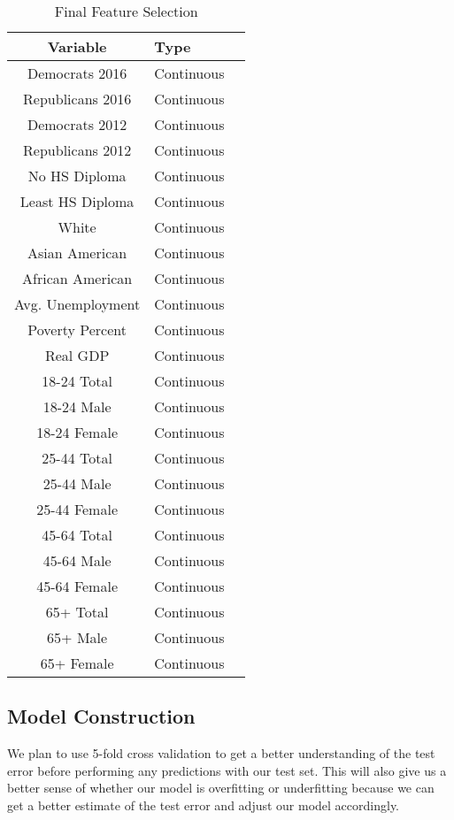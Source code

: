 \documentclass[letterpaper, twocolumn]{article}
\begin{document}
\begin{table}[htb]
    \centering
\begin{tabular}{clc} \hline
\textbf{Variable}  & \textbf{Type} \\ \hline
Democrats 2016 & Continuous   \\
Republicans 2016 & Continuous   \\
Democrats 2012 & Continuous   \\
Republicans 2012 & Continuous   \\
No HS Diploma  & Continuous   \\
Least HS Diploma & Continuous   \\
White & Continuous    \\
Asian American  & Continuous    \\
African American & Continuous    \\
Avg. Unemployment & Continuous   \\
Poverty Percent & Continuous   \\
Real GDP & Continuous   \\
18-24 Total & Continuous   \\
18-24 Male & Continuous   \\
18-24 Female & Continuous   \\
25-44 Total & Continuous   \\
25-44 Male & Continuous   \\
25-44 Female  & Continuous   \\
45-64 Total & Continuous   \\
45-64 Male & Continuous   \\
45-64 Female  & Continuous   \\
65+ Total & Continuous   \\
65+ Male & Continuous   \\
65+ Female  & Continuous   \\

\end{tabular}
    \caption{Final Feature Selection}
    \label{tab:variable}
\end{table}

\subsection{Model Construction}
We plan to use 5-fold cross validation to get a better understanding of the test error before performing any predictions with our test set. This will also give us a better sense of whether our model is overfitting or underfitting because we can get a better estimate of the test error and adjust our model accordingly.
\end{document}
